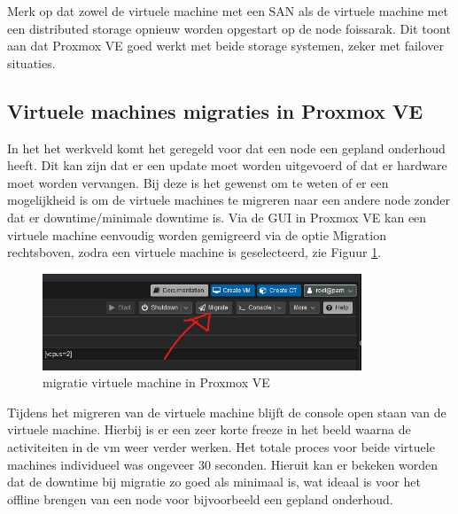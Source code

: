 Merk op dat zowel de virtuele machine met een SAN als de virtuele machine met een distributed storage opnieuw worden opgestart op de node foissarak. Dit toont aan dat Proxmox VE goed werkt met beide storage systemen, zeker met failover situaties.

\subsection{Virtuele machines migraties in Proxmox VE}
In het het werkveld komt het geregeld voor dat een node een gepland onderhoud heeft. Dit kan zijn dat er een update moet worden uitgevoerd of dat er hardware moet worden vervangen.
Bij deze is het gewenst om te weten of er een mogelijkheid is om de virtuele machines te migreren naar een andere node zonder dat er downtime/minimale downtime is.
Via de GUI in Proxmox VE kan een virtuele machine eenvoudig worden gemigreerd via de optie Migration rechtsboven, zodra een virtuele machine is geselecteerd, zie Figuur \ref{fig:migratie-vm}.
\begin{figure}[H]
  \centering
  \includegraphics[width=0.85\textwidth]{../poc/vm-migratie-prox.png}
  \caption{migratie virtuele machine in Proxmox VE}
  \label{fig:migratie-vm}
\end{figure}
Tijdens het migreren van de virtuele machine blijft de console open staan van de virtuele machine. Hierbij is er een zeer korte freeze in het beeld waarna de activiteiten in de vm weer verder werken. Het totale proces voor beide virtuele machines individueel was ongeveer 30 seconden.
Hieruit kan er bekeken worden dat de downtime bij migratie zo goed als minimaal is, wat ideaal is voor het offline brengen van een node voor bijvoorbeeld een gepland onderhoud.

